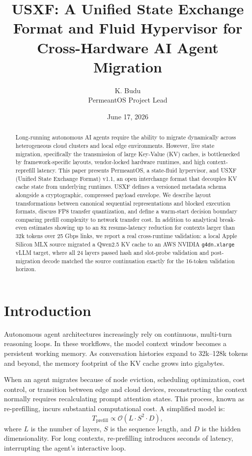 \documentclass[11pt]{article}
\title{USXF: A Unified State Exchange Format and Fluid Hypervisor for Cross-Hardware AI Agent Migration}
\author{K. Budu\\PermeantOS Project Lead}
\date{June 17, 2026}
\begin{document}
\maketitle

\begin{abstract}
Long-running autonomous AI agents require the ability to migrate dynamically across heterogeneous cloud clusters and local edge environments. However, live state migration, specifically the transmission of large Key-Value (KV) caches, is bottlenecked by framework-specific layouts, vendor-locked hardware runtimes, and high context-reprefill latency. This paper presents PermeantOS, a state-fluid hypervisor, and USXF (Unified State Exchange Format) v1.1, an open interchange format that decouples KV cache state from underlying runtimes. USXF defines a versioned metadata schema alongside a cryptographic, compressed payload envelope. We describe layout transformations between canonical sequential representations and blocked execution formats, discuss FP8 transfer quantization, and define a warm-start decision boundary comparing prefill complexity to network transfer cost. In addition to analytical break-even estimates showing up to an 8x resume-latency reduction for contexts larger than 32k tokens over 25 Gbps links, we report a real cross-runtime validation: a local Apple Silicon MLX source migrated a Qwen2.5 KV cache to an AWS NVIDIA \texttt{g4dn.xlarge} vLLM target, where all 24 layers passed hash and slot-probe validation and post-migration decode matched the source continuation exactly for the 16-token validation horizon.
\end{abstract}

\section{Introduction}

Autonomous agent architectures increasingly rely on continuous, multi-turn reasoning loops. In these workflows, the model context window becomes a persistent working memory. As conversation histories expand to 32k--128k tokens and beyond, the memory footprint of the KV cache grows into gigabytes.

When an agent migrates because of node eviction, scheduling optimization, cost control, or transition between edge and cloud devices, reconstructing the context normally requires recalculating prompt attention states. This process, known as re-prefilling, incurs substantial computational cost. A simplified model is:
\begin{equation}
T_{\text{prefill}} \propto \mathcal{O}(L \cdot S^2 \cdot D),
\end{equation}
where $L$ is the number of layers, $S$ is the sequence length, and $D$ is the hidden dimensionality. For long contexts, re-prefilling introduces seconds of latency, interrupting the agent's interactive loop.
\end{document}
